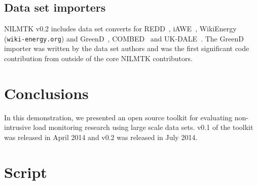 \documentclass[10pt,abstract]{sensys-proc}
\begin{document}
\subsection{Data set importers}
NILMTK v0.2 includes data set converts for REDD~\cite{redd}, iAWE~\cite{iawe}, WikiEnergy (\texttt{wiki-energy.org}) and GreenD~\cite{greend}, COMBED~\cite{combed} and UK-DALE~\cite{ukdale}.  The GreenD importer was written by the data set authors and was the first significant code contribution from outside of the core NILMTK contributors.

\section{Conclusions}
In this demonstration, we presented an open source toolkit for evaluating non-intrusive load monitoring research using large scale data sets. v0.1 of the toolkit was released in April 2014 and v0.2 was released in July 2014.






\begin{small}
  \end{small}







\newif\ifcameraready
\camerareadytrue 

\ifcameraready

\else 
\clearpage

\section{Script}
\end{document}
